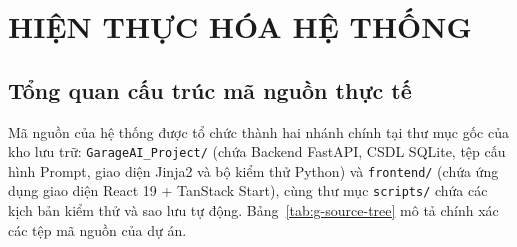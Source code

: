 \chapter{HIỆN THỰC HÓA HỆ THỐNG}

\section{Tổng quan cấu trúc mã nguồn thực tế}

Mã nguồn của hệ thống được tổ chức thành hai nhánh chính tại thư mục gốc của kho lưu trữ: \texttt{GarageAI\_Project/} (chứa Backend FastAPI, CSDL SQLite, tệp cấu hình Prompt, giao diện Jinja2 và bộ kiểm thử Python) và \texttt{frontend/} (chứa ứng dụng giao diện React 19 + TanStack Start), cùng thư mục \texttt{scripts/} chứa các kịch bản kiểm thử và sao lưu tự động. Bảng~\ref{tab:g-source-tree} mô tả chính xác các tệp mã nguồn của dự án.


